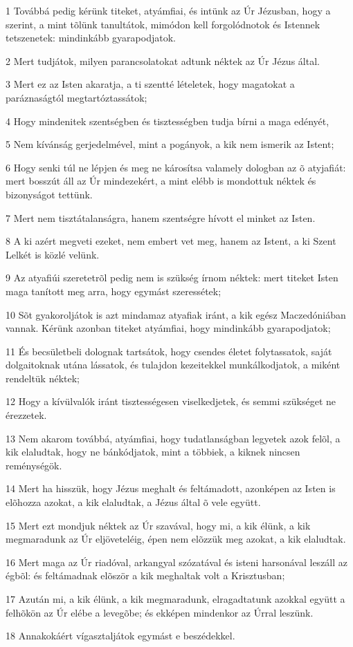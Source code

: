 \par 1 Továbbá pedig kérünk titeket, atyámfiai, és intünk az Úr Jézusban, hogy a szerint, a mint tõlünk tanultátok, mimódon kell forgolódnotok és Istennek tetszenetek: mindinkább gyarapodjatok.
\par 2 Mert tudjátok, milyen parancsolatokat adtunk néktek az Úr Jézus által.
\par 3 Mert ez az Isten akaratja, a ti szentté lételetek, hogy magatokat a paráznaságtól megtartóztassátok;
\par 4 Hogy mindenitek szentségben és tisztességben tudja bírni a maga edényét,
\par 5 Nem kívánság gerjedelmével, mint a pogányok, a kik nem ismerik az Istent;
\par 6 Hogy senki túl ne lépjen és meg ne károsítsa valamely dologban az õ atyjafiát: mert bosszút áll az Úr mindezekért, a mint elébb is mondottuk néktek és bizonyságot tettünk.
\par 7 Mert nem tisztátalanságra, hanem szentségre hívott el minket az Isten.
\par 8 A ki azért megveti ezeket, nem embert vet meg, hanem az Istent, a ki Szent Lelkét is közlé velünk.
\par 9 Az atyafiúi szeretetrõl pedig nem is szükség írnom néktek: mert titeket Isten maga tanított meg arra, hogy egymást szeressétek;
\par 10 Sõt gyakoroljátok is azt mindamaz atyafiak iránt, a kik egész Maczedóniában vannak. Kérünk azonban titeket atyámfiai, hogy mindinkább gyarapodjatok;
\par 11 És becsületbeli dolognak tartsátok, hogy csendes életet folytassatok, saját dolgaitoknak utána lássatok, és tulajdon kezeitekkel munkálkodjatok, a miként rendeltük néktek;
\par 12 Hogy a kívülvalók iránt tisztességesen viselkedjetek, és semmi szükséget ne érezzetek.
\par 13 Nem akarom továbbá, atyámfiai, hogy tudatlanságban legyetek azok felõl, a kik elaludtak, hogy ne bánkódjatok, mint a többiek, a kiknek nincsen reménységök.
\par 14 Mert ha hisszük, hogy Jézus meghalt és feltámadott, azonképen az Isten is elõhozza azokat, a kik elaludtak, a Jézus által õ vele együtt.
\par 15 Mert ezt mondjuk néktek az Úr szavával, hogy mi, a kik élünk, a kik megmaradunk az Úr eljöveteléig, épen nem elõzzük meg azokat, a kik elaludtak.
\par 16 Mert maga az Úr riadóval, arkangyal szózatával és isteni harsonával leszáll az égbõl: és feltámadnak elõször a kik meghaltak volt a Krisztusban;
\par 17 Azután mi, a kik élünk, a kik megmaradunk, elragadtatunk azokkal együtt a felhõkön az Úr elébe a levegõbe; és ekképen mindenkor az Úrral leszünk.
\par 18 Annakokáért vígasztaljátok egymást e beszédekkel.

